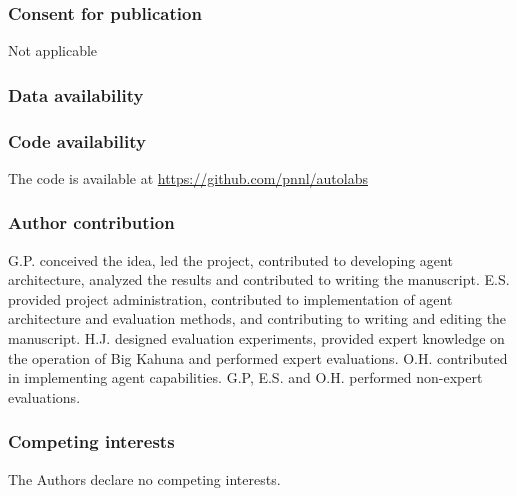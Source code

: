 \documentclass[sn-nature, twocolumn]{sn-jnl}%
\theoremstyle{thmstyleone}%
\theoremstyle{thmstyletwo}%
\theoremstyle{thmstylethree}%
\begin{document}
\subsubsection*{Consent for publication}
Not applicable
\subsubsection*{Data availability }

\subsubsection*{Code availability }
The code is available at \url{https://github.com/pnnl/autolabs}
\subsubsection*{Author contribution}
G.P. conceived the idea, led the project, contributed to developing agent architecture, analyzed the results and contributed to writing the manuscript. E.S. provided project administration, contributed to implementation of agent architecture and evaluation methods, and contributing to writing and editing the manuscript. H.J. designed evaluation experiments, provided expert knowledge on the operation of Big Kahuna and performed expert evaluations. O.H. contributed in implementing agent capabilities. G.P, E.S. and O.H. performed non-expert evaluations.


\subsubsection*{Competing interests}
The Authors declare no competing interests.



\end{document}

